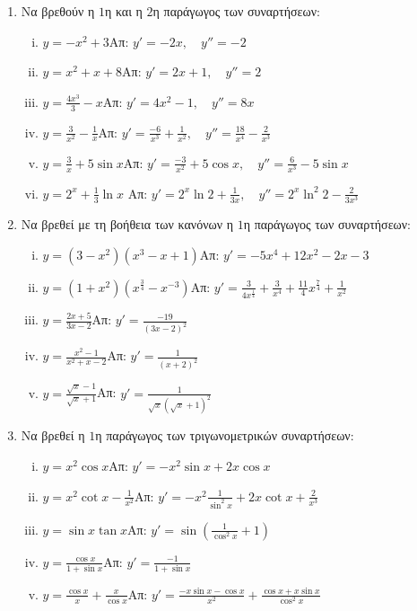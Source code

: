 \documentclass[a4paper,12pt]{article}
\begin{document}
\begin{center}
\end{center}

\vspace{1cm}



\begin{enumerate}
\item Να βρεθούν η $1$η και η $2$η παράγωγος των συναρτήσεων:
\begin{enumerate}[i)]
\item $y=-x^2+3$\hfill Απ: $y'=-2x,\quad y''=-2$
\item $y=x^2+x+8$\hfill Απ: $y'=2x+1,\quad y''=2$
\item $y=\frac{4x^3}{3}-x$\hfill Απ: $y'=4x^2-1,\quad y''=8x$
\item $y= \frac{3}{x^{2}} -\frac{1}{x}$\hfill Απ: $y'=\frac{-6}{x^3}+\frac{1}{x^2},\quad y''= \frac{18}{x^4}-\frac{2}{x^3}$
\item $y=\frac{3}{x}+5\sin x$\hfill Απ: $y'=\frac{-3}{x^2}+5\cos x, \quad y'' = \frac{6}{x^{3}}
	-5 \sin{x}$ 
\item $ y = 2^{x} + \frac{1}{3} \ln{x} $ \hfill Απ: $ y' = 2^{x}\ln{2} + \frac{1}{3x}, \quad y'' =
	2^{x}\ln^{2}2 - \frac{2}{3x^{3}}  $
\end{enumerate}

\item Να βρεθεί με τη βοήθεια των κανόνων η $1$η παράγωγος των συναρτήσεων:

\begin{enumerate}[i)]
\item $y=(3-x^2)(x^3-x+1)$\hfill Απ: $y'=-5x^4+12x^2-2x-3$
\item $y=(1+x^2)(x^{\frac{3}{4}}-x^{-3})$\hfill Απ: $y'=\frac{3}{4x^{\frac{1}{4}}}+\frac{3}{x^4}+\frac{11}{4}x^{\frac{7}{4}}+\frac{1}{x^2}$
\item $y=\frac{2x+5}{3x-2}$\hfill Απ: $y'=\frac{-19}{(3x-2)^2}$
\item $y=\frac{x^2-1}{x^2+x-2}$\hfill Απ: $y'=\frac{1}{(x+2)^2}$
\item $y=\frac{\sqrt{x}-1}{\sqrt{x}+1}$\hfill Απ: $y'=\frac{1}{\sqrt{x}(\sqrt{x}+1)^2}$
\end{enumerate}

\item Να βρεθεί η $1$η παράγωγος των τριγωνομετρικών συναρτήσεων:

\begin{enumerate}[i)]
\item $y=x^2\cos x$\hfill Απ: $y'=-x^2\sin x+2x\cos x$
\item $y=x^2\cot x -\frac{1}{x^2}$\hfill Απ: $y'=-x^2\frac{1}{\sin^2 x}+2x\cot x+\frac{2}{x^3}$
\item $y=\sin x \tan x$\hfill Απ: $y'=\sin\left(\frac{1}{\cos^2{x}}+1\right)$
\item $y=\frac{\cos x}{1+\sin x}$\hfill Απ: $y'=\frac{-1}{1+\sin x}$
\item $y = \frac{\cos x}{x}+\frac{x}{\cos x}$\hfill Απ: $y'=\frac{-x\sin x-\cos x}{x^2}+\frac{\cos x+x\sin x}{\cos^2 x}$
\end{enumerate}


\end{enumerate}
\end{document}
